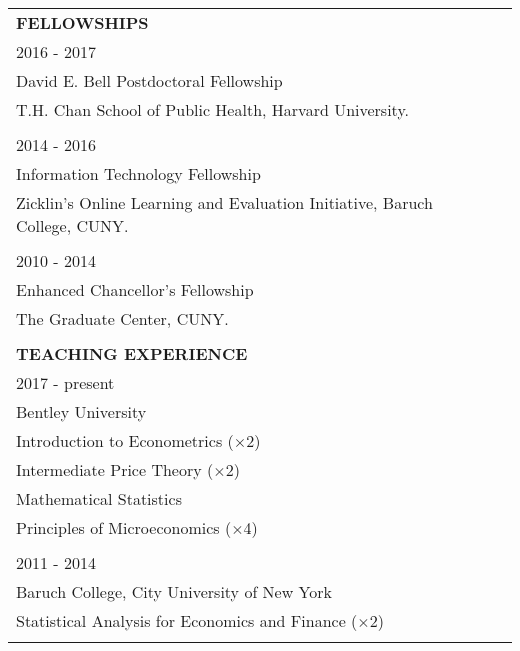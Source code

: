 \documentclass[12 pt]{article}
\begin{document}
\begin{longtable}{ccccc}
\\


 \multicolumn{5}{l}{\textbf{FELLOWSHIPS}}\\[2 pt] 
 \multicolumn{4}{l}{2016 - 2017} \\
 \multicolumn{4}{l}{David E. Bell Postdoctoral Fellowship} \\
\multicolumn{4}{l}{T.H. Chan School of Public Health, Harvard University.}   \\
\\


 \multicolumn{4}{l}{2014 - 2016} \\
 \multicolumn{4}{l}{Information Technology Fellowship} \\
\multicolumn{4}{l}{Zicklin's Online Learning and Evaluation Initiative, Baruch College, CUNY.}   \\

\\

 \multicolumn{4}{l}{2010 - 2014} \\
 \multicolumn{4}{l}{Enhanced Chancellor's Fellowship}  \\
\multicolumn{4}{l}{The Graduate Center, CUNY.}   \\

\\


 \multicolumn{5}{l}{\textbf{TEACHING EXPERIENCE}}\\[2 pt] 
  \multicolumn{4}{l}{2017 - present} \\
\multicolumn{4}{l}{Bentley University}   \\
 \multicolumn{4}{l}{Introduction to Econometrics ($\times$2)}      \\
  \multicolumn{4}{l}{Intermediate Price Theory ($\times$2)}    \\
 \multicolumn{4}{l}{Mathematical Statistics}      \\
\multicolumn{4}{l}{Principles of Microeconomics ($\times$4)} \\

\\
 \multicolumn{4}{l}{2011 - 2014} \\
\multicolumn{4}{l}{Baruch College, City University of New York}     \\

\multicolumn{4}{l}{Statistical Analysis for Economics and Finance ($\times$2)}        \\

\\


\end{longtable}
\end{document}
